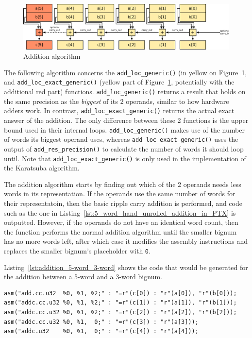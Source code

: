 \documentclass[12pt, a4paper]{report}
\begin{document}
\begin{figure}[h]
\centering
\includegraphics[width=\linewidth]{figs/addition}
\caption{Addition algorithm}
\label{fig:addition}
\end{figure}

The following algorithm concerns the \verb+add_loc_generic()+ (in yellow on
Figure~\ref{fig:addition}, and \verb+add_loc_exact_generic()+ (yellow part of
Figure~\ref{fig:addition}, potentially with the additional red part) functions.
\verb+add_loc_generic()+ returns a result that holds on the same precision as
the \emph{biggest} of its 2 operands, similar to how hardware adders work.
In contrast, \verb+add_loc_exact_generic()+ returns the actual exact answer of
the addition. The only difference between these 2 functions is the upper bound
used in their internal loops. \verb+add_loc_generic()+ makes use of the number
of words its biggest operand uses, whereas \verb+add_loc_exact_generic()+ uses
the output of \verb+add_res_precision()+ to calculate the number of words it
should loop until.
Note that \verb+add_loc_exact_generic()+ is only used in the implementation of
the Karatsuba algorithm.

The addition algorithm starts by finding out which of the 2 operands needs less
words in its representation.
If the operands use the same number of words for their representatoin, then the
basic ripple carry addition is performed, and code such as the one in
Listing~\ref{lst:5_word_hand_unrolled_addition_in_PTX} is outputted.
However, if the operands do not have an identical word count, then the function
performs the normal addition algorithm until the smaller bignum has no more
words left, after which case it modifies the assembly instructions and replaces
the smaller bignum's placeholder with \verb+0+.

Listing~\ref{lst:addition_5-word_3-word} shows the code that would be generated
for the addition between a 5-word and a 3-word bignum.

\begin{lstlisting}
asm("add.cc.u32  %0, %1, %2;" : "=r"(c[0]) : "r"(a[0]), "r"(b[0]));
asm("addc.cc.u32 %0, %1, %2;" : "=r"(c[1]) : "r"(a[1]), "r"(b[1]));
asm("addc.cc.u32 %0, %1, %2;" : "=r"(c[2]) : "r"(a[2]), "r"(b[2]));
asm("addc.cc.u32 %0, %1,  0;" : "=r"(c[3]) : "r"(a[3]));
asm("addc.u32    %0, %1,  0;" : "=r"(c[4]) : "r"(a[4]));
\end{lstlisting}
\end{document}

